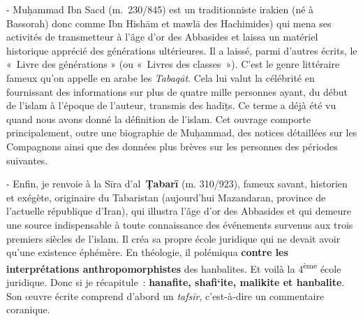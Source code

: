 - Muḥammad Ibn Sacd (m.~230/845) est un traditionniste irakien (né à
Bassorah) donc comme Ibn Hishām et mawlā des Hachimides) qui mena ses
activités de transmetteur à l'âge d'or des Abbasides et laissa un
matériel historique apprécié des générations ultérieures. Il a laissé,
parmi d'autres écrits, le «~Livre des générations » (ou «~Livres des classes~»). C'est le genre
littéraire fameux qu'on appelle en arabe les \emph{Tabaqāt}. Cela lui valut la célébrité en fournissant des informations
sur plus de quatre mille personnes ayant, du début de l'islam à l'époque
de l'auteur, transmis des hadīṯs. Ce terme a déjà été vu quand nous
avons donné la définition de l'islam. Cet ouvrage comporte
principalement, outre une biographie de Muḥammad, des notices détaillées
sur les Compagnons ainsi que des données plus brèves sur les personnes
des périodes suivantes.

- Enfin, je renvoie à la Sīra d'al~\textbf{Ṭabarī} (m. 310/923), fameux
savant, historien et exégète, originaire du Tabaristan (aujourd'hui
Mazandaran, province de l'actuelle république d'Iran), qui illustra
l'âge d'or des Abbasides et qui demeure une source indispensable à toute
connaissance des événements survenus aux trois premiers siècles de
l'islam. Il créa sa propre école juridique qui ne devait avoir qu'une
existence éphémère. En théologie, il polémiqua \textbf{contre les
interprétations anthropomorphistes} des hanbalites. Et voilà la
4\textsuperscript{ème} école juridique. Donc si je récapitule~:
\textbf{hanafite, shafi`ite, malikite et hanbalite}. Son œuvre écrite
comprend d'abord un \emph{tafsīr}, c'est-à-dire un commentaire
coranique.

